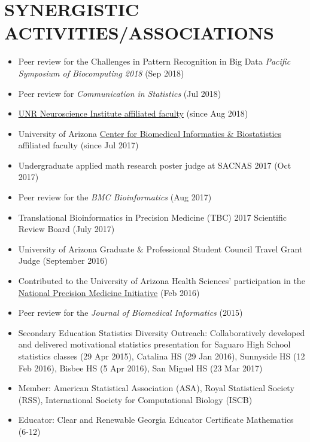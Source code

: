\documentclass[paper=a4,fontsize=11pt]{scrartcl} %
\newcommand{\NewPart}[2]{\section*{\uppercase{#1} #2 }}
\begin{document}

\NewPart{Synergistic Activities/Associations}{}
\vspace{-7pt}
\begin{itemize}[noitemsep]
  \item Peer review for the Challenges in Pattern Recognition in Big Data \emph{Pacific Symposium of Biocomputing 2018} (Sep 2018)
  \item Peer review for \emph{Communication in Statistics} (Jul 2018)
\item \href{https://www.unr.edu/neuroscience/people}{UNR Neuroscience Institute affiliated faculty} (since Aug 2018)
  \item University of Arizona \href{http://cb2.uahs.arizona.edu/}{Center for Biomedical Informatics \& Biostatistics} affiliated faculty (since Jul 2017)
\item Undergraduate applied math research poster judge at SACNAS 2017 (Oct 2017)
\item Peer review for the \emph{BMC Bioinformatics} (Aug 2017)
\item Translational Bioinformatics in Precision Medicine (TBC) 2017 Scientific Review Board (July 2017)
\item University of Arizona Graduate \& Professional Student Council Travel Grant Judge (September 2016)
\item Contributed to the University of Arizona Health Sciences' participation in the   \href{https://www.nih.gov/precision-medicine-initiative-cohort-program}{National Precision Medicine Initiative\circledR}  \hspace{3pt}(Feb 2016)
  \item Peer review for the \emph{Journal of Biomedical Informatics} (2015)
\item Secondary Education Statistics Diversity Outreach: Collaboratively developed and delivered motivational statistics presentation for Saguaro High School statistics classes (29 Apr 2015), Catalina HS (29 Jan 2016), Sunnyside HS (12 Feb 2016), Bisbee HS (5 Apr 2016), San Miguel HS (23 Mar 2017)
\item Member: American Statistical Association (ASA), Royal Statistical Society (RSS), International Society for Computational Biology (ISCB)
\item Educator: Clear and Renewable Georgia Educator Certificate Mathematics (6-12)
\vspace{-7pt}
\end{itemize}
\end{document}
